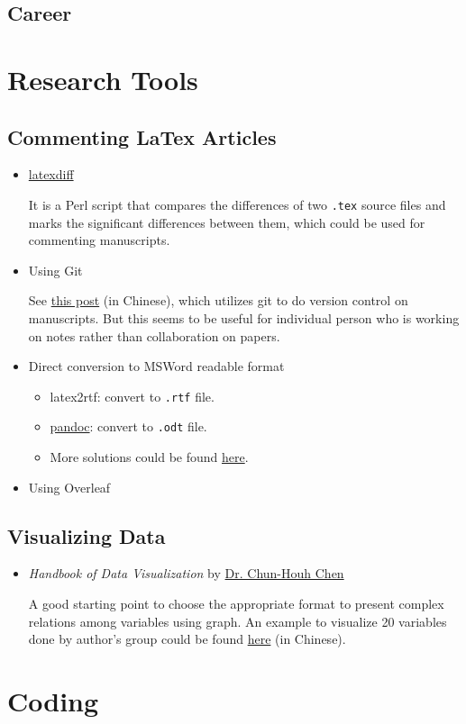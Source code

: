 \documentclass[11pt]{article}
\begin{document}
\subsection{Career}
\label{sec-7-5}


\section{Research Tools}
\label{sec-8}
\subsection{Commenting LaTex Articles}
\label{sec-8-1}
\begin{itemize}
\item \href{http://ftp.math.purdue.edu/mirrors/ctan.org/support/latexdiff/doc/latexdiff-man.pdf}{latexdiff}

It is a Perl script that compares the differences of two \verb~.tex~ source files
and marks the significant differences between them, which could be used for
commenting manuscripts.
\item Using Git

See \href{https://www.zhihu.com/question/22316670/answer/131793794}{this post} (in Chinese), which utilizes git to do version control on manuscripts. But this seems to be useful
for individual person who is working on notes rather than collaboration on papers.
\item Direct conversion to MSWord readable format
\begin{itemize}
\item latex2rtf: convert to \verb~.rtf~ file.
\item \href{https://pandoc.org/MANUAL.html}{pandoc}: convert to \verb~.odt~ file.
\item More solutions could be found \href{https://tex.stackexchange.com/questions/111886/how-to-convert-a-scientific-manuscript-from-latex-to-word-using-pandoc}{here}.
\end{itemize}
\item Using Overleaf
\end{itemize}
\subsection{Visualizing Data}
\label{sec-8-2}
\begin{itemize}
\item \emph{Handbook of Data Visualization} by \href{http://www3.stat.sinica.edu.tw/library/anniversary/people/faculty/faculty_cchen.htm}{Dr. Chun-Houh Chen} 

A good starting point to choose the appropriate format to 
present complex relations among variables using graph. An example
to visualize 20 variables done by author's group could be found \href{http://gap.stat.sinica.edu.tw/3476.pdf}{here}
(in Chinese).
\end{itemize}
\section{Coding}
\label{sec-9}
\end{document}
